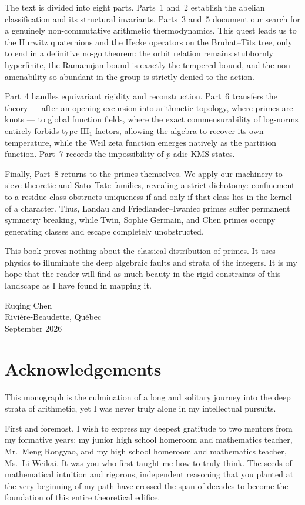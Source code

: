 The text is divided into eight parts. Parts~1 and~2 establish the abelian classification
and its structural invariants. Parts~3 and~5 document our search for a genuinely
non-commutative arithmetic thermodynamics. This quest leads us to the Hurwitz quaternions
and the Hecke operators on the Bruhat--Tits tree, only to end in a definitive no-go
theorem: the orbit relation remains stubbornly hyperfinite, the Ramanujan bound is exactly
the tempered bound, and the non-amenability so abundant in the group is strictly denied to
the action.

Part~4 handles equivariant rigidity and reconstruction. Part~6 transfers the theory ---
after an opening excursion into arithmetic topology, where primes are knots --- to global
function fields, where the exact commensurability of log-norms entirely forbids type
$\mathrm{III}_1$ factors, allowing the algebra to recover its own temperature, while the
Weil zeta function emerges natively as the partition function. Part~7 records the
impossibility of $p$-adic KMS states.

Finally, Part~8 returns to the primes themselves. We apply our machinery to
sieve-theoretic and Sato--Tate families, revealing a strict dichotomy: confinement to a
residue class obstructs uniqueness if and only if that class lies in the kernel of a
character. Thus, Landau and Friedlander--Iwaniec primes suffer permanent symmetry
breaking, while Twin, Sophie Germain, and Chen primes occupy generating classes and escape
completely unobstructed.

This book proves nothing about the classical distribution of primes. It uses physics to
illuminate the deep algebraic faults and strata of the integers. It is my hope that the
reader will find as much beauty in the rigid constraints of this landscape as I have found
in mapping it.

\bigskip
\noindent Ruqing Chen\\
Rivi\`ere-Beaudette, Qu\'ebec\\
September 2026

\chapter*{Acknowledgements}

This monograph is the culmination of a long and solitary journey into the deep strata of
arithmetic, yet I was never truly alone in my intellectual pursuits.

First and foremost, I wish to express my deepest gratitude to two mentors from my
formative years: my junior high school homeroom and mathematics teacher, Mr.~Meng
Rongyao, and my high school homeroom and mathematics teacher, Ms.~Li Weikai.
It was you who first taught me how to truly think. The seeds of mathematical intuition
and rigorous, independent reasoning that you planted at the very beginning of my path
have crossed the span of decades to become the foundation of this entire theoretical
edifice.

